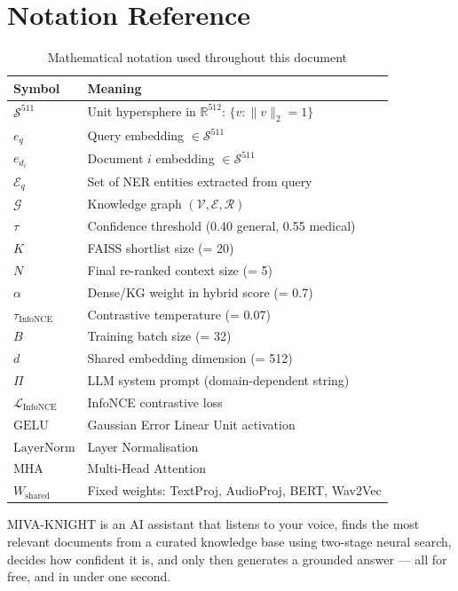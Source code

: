 \documentclass[12pt,a4paper]{article}
\theoremstyle{definition}
\theoremstyle{plain}
\theoremstyle{remark}
\newcommand{\R}{\mathbb{R}}
\newcommand{\Sph}{\mathcal{S}}
\newcommand{\Loss}{\mathcal{L}}
\newcommand{\KG}{\mathcal{G}}
\newcommand{\Ent}{\mathcal{E}}
\newcommand{\LN}{\mathrm{LayerNorm}}
\newcommand{\GELU}{\mathrm{GELU}}
\newcommand{\MHA}{\mathrm{MHA}}
\begin{document}
\newpage
\section{Notation Reference}

\begin{table}[htbp]
\centering
\caption{Mathematical notation used throughout this document}
\begin{tabular}{ll}
\toprule
Symbol & Meaning \\
\midrule
$\Sph^{511}$ & Unit hypersphere in $\R^{512}$: $\{v : \|v\|_2=1\}$ \\
$e_q$ & Query embedding $\in \Sph^{511}$ \\
$e_{d_i}$ & Document $i$ embedding $\in \Sph^{511}$ \\
$\mathcal{E}_q$ & Set of NER entities extracted from query \\
$\KG$ & Knowledge graph $(\mathcal{V}, \Ent, \mathcal{R})$ \\
$\tau$ & Confidence threshold (0.40 general, 0.55 medical) \\
$K$ & FAISS shortlist size (= 20) \\
$N$ & Final re-ranked context size (= 5) \\
$\alpha$ & Dense/KG weight in hybrid score (= 0.7) \\
$\tau_{\text{InfoNCE}}$ & Contrastive temperature (= 0.07) \\
$B$ & Training batch size (= 32) \\
$d$ & Shared embedding dimension (= 512) \\
$\Pi$ & LLM system prompt (domain-dependent string) \\
$\Loss_{\text{InfoNCE}}$ & InfoNCE contrastive loss \\
$\GELU$ & Gaussian Error Linear Unit activation \\
$\LN$ & Layer Normalisation \\
$\MHA$ & Multi-Head Attention \\
$W_{\text{shared}}$ & Fixed weights: TextProj, AudioProj, BERT, Wav2Vec \\
\bottomrule
\end{tabular}
\end{table}

\vfill
\begin{tcolorbox}[laymanbox, title={One-Sentence Summary}]
MIVA-KNIGHT is an AI assistant that listens to your voice, finds the most relevant
documents from a curated knowledge base using two-stage neural search, decides how
confident it is, and only then generates a grounded answer — all for free, and in
under one second.
\end{tcolorbox}
\end{document}
